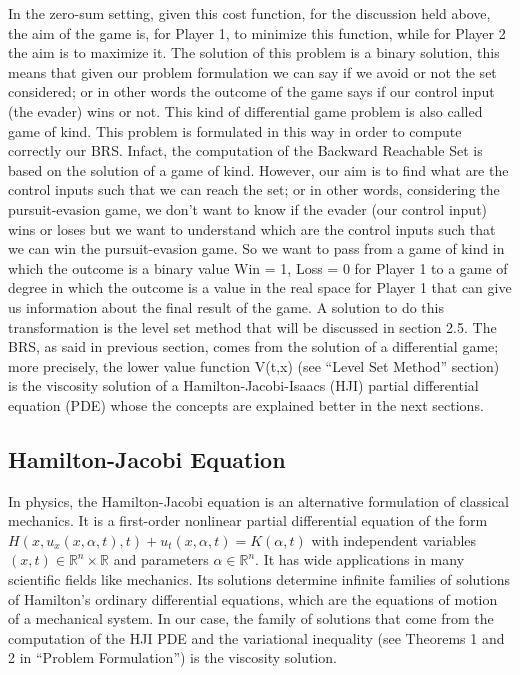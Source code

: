 

In the zero-sum setting, given this cost function, for the discussion held above, the aim of the game is, for Player 1, to minimize this function, while for Player 2 the aim is to maximize it.
The solution of this problem is a binary solution, this means that given our problem formulation we can say if we avoid or not the set considered; or in other words the outcome of the game says if our control input (the evader) wins or not. This kind of differential game problem is also called game of kind. This problem is formulated in this way in order to compute correctly our BRS. Infact, the computation of the Backward Reachable Set is based on the solution of a game of kind. However, our aim is to find what are the control inputs such that we can reach the set; or in other words, considering the pursuit-evasion game, we don't want to know if the evader (our control input) wins or loses but we want to understand which are the control inputs such that we can win the pursuit-evasion game. So we want to pass from a game of kind in which the outcome is a binary value {Win = 1, Loss = 0} for Player 1 to a game of degree in which the outcome is a value in the real space for Player 1 that can give us information about the final result of the game. A solution to do this transformation is the level set method that will be discussed in section 2.5.  
The BRS, as said in previous section, comes from the solution of a differential game; more precisely, the lower value function V(t,x) (see “Level Set Method” section) is the viscosity solution of a Hamilton-Jacobi-Isaacs (HJI) partial differential equation (PDE) whose the concepts are explained better in the next sections. 

\subsection{Hamilton-Jacobi Equation}					
In physics, the Hamilton-Jacobi equation is an alternative formulation of classical mechanics. It is a first-order nonlinear partial differential equation of the form $H(x,u_x(x,\alpha,t),t)+u_t(x,\alpha,t)=K(\alpha,t)$ with independent variables $(x,t)\in \mathbb{R}^n \times \mathbb{R}$ and parameters $\alpha \in \mathbb{R}^n$. It has wide applications in many scientific fields like mechanics. Its solutions determine infinite families of solutions of Hamilton's ordinary differential equations, which are the equations of motion of a mechanical system. In our case, the family of solutions that come from the computation of the HJI PDE and the variational inequality (see Theorems 1 and 2 in “Problem Formulation”) is the viscosity solution. 

